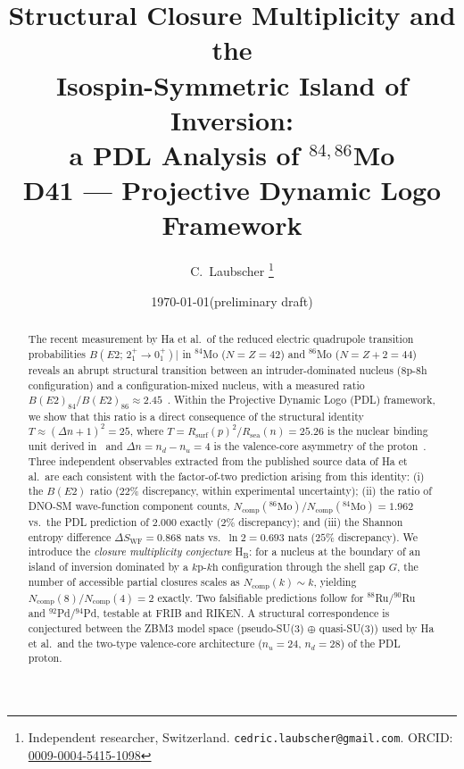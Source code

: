 \documentclass[11pt,a4paper]{article}
\theoremstyle{definition}
\newcommand{\PDL}{\textnormal{PDL}}
\newcommand{\Rsurf}{R_{\mathrm{surf}}}
\newcommand{\Rsea}{R_{\mathrm{sea}}}
\newcommand{\Dn}{\Delta n}
\newcommand{\Ncomp}{N_{\mathrm{comp}}}
\newcommand{\Swf}{S_{\mathrm{WF}}}
\newcommand{\BE}[1]{B(E2;\,{2^+_1}\!\to\!{0^+_1})\big|_{#1}}
\newcommand{\Tpdl}{T}
\newcommand{\kph}{k\text{p-}k\text{h}}
\begin{document}
\title{%
  Structural Closure Multiplicity and the\\
  Isospin-Symmetric Island of Inversion:\\
  a PDL Analysis of $^{84,86}$Mo\\[4pt]
  \large\normalfont D41 --- Projective Dynamic Logo Framework%
}
\author{%
  C.~Laubscher%
  \thanks{Independent researcher, Switzerland.
    \texttt{cedric.laubscher@gmail.com}.
    ORCID: \href{https://orcid.org/0009-0004-5415-1098}{0009-0004-5415-1098}}\\[4pt]
}
\date{\small\today\quad(preliminary draft)}

\maketitle

\begin{abstract}
The recent measurement by Ha et al.\ of the reduced electric
quadrupole transition probabilities $\BE{}$ in $^{84}$Mo ($N=Z=42$) and
$^{86}$Mo ($N=Z+2=44$) reveals an abrupt structural transition between an
intruder-dominated nucleus (8p-8h configuration) and a
configuration-mixed nucleus, with a measured ratio
$B(E2)_{84}/B(E2)_{86} \approx 2.45$~\cite{Ha_2025}.
Within the Projective Dynamic Logo (\PDL) framework, we show that this ratio
is a direct consequence of the structural identity
$\Tpdl \approx (\Dn+1)^2 = 25$,
where $\Tpdl = \Rsurf(p)^2/\Rsea(n) = 25.26$ is the nuclear binding unit
derived in~\cite{PDL_D40_2026} and
$\Dn = n_d - n_u = 4$ is the valence-core asymmetry of the
proton~\cite{PDL_D22_2026}.
Three independent observables extracted from the published source data of
Ha et al.\ are each consistent with the factor-of-two prediction arising
from this identity: (i) the $B(E2)$ ratio ($22\%$ discrepancy, within
experimental uncertainty); (ii) the ratio of DNO-SM wave-function
component counts, $\Ncomp(^{86}\text{Mo})/\Ncomp(^{84}\text{Mo}) = 1.962$
vs.\ the PDL prediction of $2.000$ exactly ($2\%$ discrepancy); and
(iii) the Shannon entropy difference $\Delta\Swf = 0.868$ nats
vs.\ $\ln 2 = 0.693$ nats ($25\%$ discrepancy).
We introduce the \emph{closure multiplicity conjecture} H$_\mathrm{B}$:
for a nucleus at the boundary of an island of inversion dominated by a
$\kph$ configuration through the shell gap $G$, the number of accessible
partial closures scales as $\Ncomp(k) \sim k$, yielding $\Ncomp(8)/\Ncomp(4)
= 2$ exactly.
Two falsifiable predictions follow for $^{88}$Ru/$^{90}$Ru and
$^{92}$Pd/$^{94}$Pd, testable at FRIB and RIKEN.
A structural correspondence is conjectured between the ZBM3 model space
(pseudo-SU(3) $\oplus$ quasi-SU(3)) used by Ha et al.\ and the
two-type valence-core architecture ($n_u = 24$, $n_d = 28$) of the
PDL proton.
\end{abstract}
\end{document}
